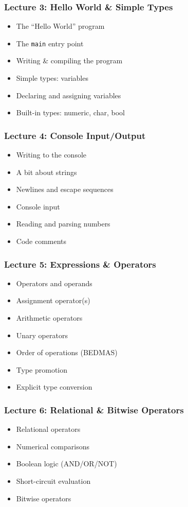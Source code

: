 \begin{frame}
\frametitle{Lecture 3: Hello World \& Simple Types}

{\Large
\begin{itemize}
	\item The ``Hello World'' program
	\item The \texttt{main} entry point
	\item Writing \& compiling the program
	\item Simple types: variables
	\item Declaring and assigning variables
	\item Built-in types: numeric, char, bool
\end{itemize}
}

\end{frame}


\begin{frame}
\frametitle{Lecture 4: Console Input/Output}

{\Large
\begin{itemize}
	\item Writing to the console
	\item A bit about strings
	\item Newlines and escape sequences
	\item Console input
	\item Reading and parsing numbers
	\item Code comments
\end{itemize}
}

\end{frame}


\begin{frame}
\frametitle{Lecture 5: Expressions \& Operators}

{\Large
\begin{itemize}
	\item Operators and operands
	\item Assignment operator(s)
	\item Arithmetic operators
	\item Unary operators
	\item Order of operations (BEDMAS)
	\item Type promotion
	\item Explicit type conversion
\end{itemize}
}

\end{frame}



\begin{frame}
\frametitle{Lecture 6: Relational \& Bitwise Operators}

{\Large
\begin{itemize}
	\item Relational operators
	\item Numerical comparisons
	\item Boolean logic (AND/OR/NOT)
	\item Short-circuit evaluation
	\item Bitwise operators
\end{itemize}
}

\end{frame}



